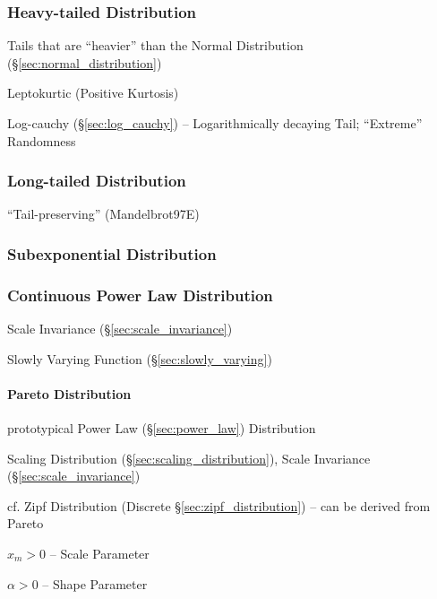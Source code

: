\subsubsection{Heavy-tailed Distribution}\label{sec:heavy_tailed}

Tails that are ``heavier'' than the Normal Distribution
(\S\ref{sec:normal_distribution})

Leptokurtic (Positive Kurtosis)

Log-cauchy (\S\ref{sec:log_cauchy}) -- Logarithmically decaying Tail;
``Extreme'' Randomness



\subsubsection{Long-tailed Distribution}\label{sec:long_tailed}

``Tail-preserving'' (Mandelbrot97E)



\subsubsection{Subexponential Distribution}
\label{sec:subexponential_distribution}

\subsubsection{Continuous Power Law Distribution}
\label{sec:continuous_power_law}

Scale Invariance (\S\ref{sec:scale_invariance})

Slowly Varying Function (\S\ref{sec:slowly_varying})



\paragraph{Pareto Distribution}\label{sec:pareto_distribution}\hfill

prototypical Power Law (\S\ref{sec:power_law}) Distribution

Scaling Distribution (\S\ref{sec:scaling_distribution}),
Scale Invariance (\S\ref{sec:scale_invariance})

cf. Zipf Distribution (Discrete \S\ref{sec:zipf_distribution}) -- can be derived
from Pareto

$x_m > 0$ -- Scale Parameter

$\alpha > 0$ -- Shape Parameter

